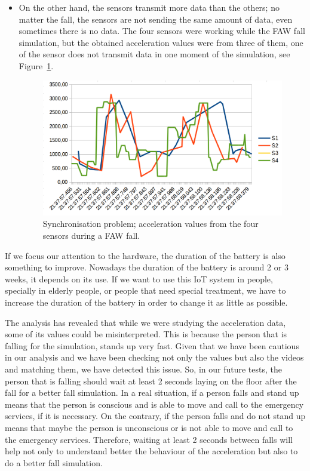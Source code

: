 \documentclass[conference]{IEEEtran}
\theoremstyle{definition}
\begin{document}
\begin{itemize}
 \item On the other hand, the sensors transmit more data than the others; no matter the fall, the sensors are not 
 sending the same amount of data, even sometimes there is no data. The four sensors were working while the FAW fall
 simulation, but the obtained acceleration values were from three of them, one of the sensor does not transmit data 
 in one moment of the simulation, see Figure~\ref{fig:synchronisation2}.
 \begin{figure}[!h]
  \centering
  \includegraphics[scale=0.2]{img/synchronisation2.png}
  \caption[Comparison acceleration during two FAW falls]{Synchronisation problem; acceleration values from the four sensors during a FAW fall.}
  \label{fig:synchronisation2}
 \end{figure}
\end{itemize}

If we focus our attention to the hardware, the duration of the battery is also something to improve. Nowadays the 
duration of the battery is around 2 or 3 weeks, it depends on its use. If we want to use this IoT system in people, 
specially in elderly people, or people that need special treatment, we have to increase the duration of the battery 
in order to change it as little as possible.

The analysis has revealed that while we were studying the acceleration data, some of its values could be misinterpreted.
This is because the person that is falling for the simulation, stands up very fast. Given that we have been cautious
in our analysis and we have been checking not only the values but also the videos and matching them, we have detected
this issue. So, in our future tests, the person that is falling should wait at least 2 seconds laying on the floor 
after the fall for a better fall simulation. In a real situation, if a person falls and stand up means that the person
is conscious and is able to move and call to the emergency services, if it is necessary. On the contrary, if the person
falls and do not stand up means that maybe the person is unconscious or is not able to move and call to the emergency
services. Therefore, waiting at least 2 seconds between falls will help not only to understand better the behaviour of the 
acceleration but also to do a better fall simulation.
\end{document}
